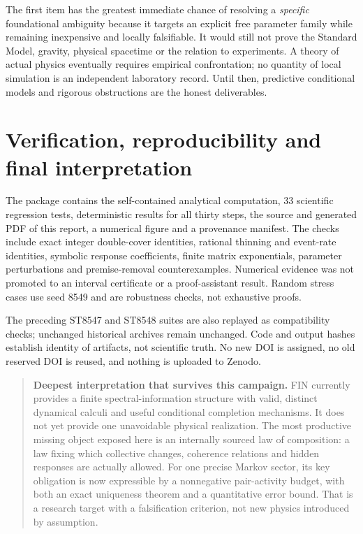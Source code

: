 \documentclass[11pt,a4paper]{article}
\begin{document}
The first item has the greatest immediate chance of resolving a
\emph{specific} foundational ambiguity because it targets an explicit free
parameter family while remaining inexpensive and locally falsifiable.
It would still not prove the Standard Model, gravity, physical spacetime or
the relation to experiments. A theory of actual physics eventually requires
empirical confrontation; no quantity of local simulation is an independent
laboratory record. Until then, predictive conditional models and rigorous
obstructions are the honest deliverables.

\section{Verification, reproducibility and final interpretation}

The package contains the self-contained analytical computation, 33
scientific regression tests, deterministic results for all thirty steps,
the source and generated PDF of this report, a numerical figure and a
provenance manifest. The checks include exact integer double-cover
identities, rational thinning and event-rate identities, symbolic response
coefficients, finite matrix exponentials, parameter perturbations and
premise-removal counterexamples. Numerical evidence was not promoted to an
interval certificate or a proof-assistant result. Random stress cases use
seed 8549 and are robustness checks, not exhaustive proofs.

The preceding ST8547 and ST8548 suites are also replayed as compatibility
checks; unchanged historical archives remain unchanged. Code and output
hashes establish identity of artifacts, not scientific truth. No new DOI is
assigned, no old reserved DOI is reused, and nothing is uploaded to Zenodo.

\begin{quote}
\textbf{Deepest interpretation that survives this campaign.}
FIN currently provides a finite spectral-information structure with valid,
distinct dynamical calculi and useful conditional completion mechanisms.
It does not yet provide one unavoidable physical realization. The most
productive missing object exposed here is an internally sourced law of
composition: a law fixing which collective changes, coherence relations and
hidden responses are actually allowed. For one precise Markov sector, its
key obligation is now expressible by a nonnegative pair-activity budget,
with both an exact uniqueness theorem and a quantitative error bound.
That is a research target with a falsification criterion, not new physics
introduced by assumption.
\end{quote}
\end{document}
